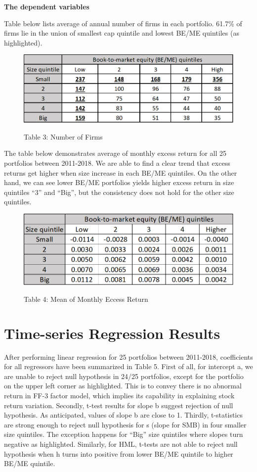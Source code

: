 \documentclass[12pt]{article}
\begin{document}
\textbf{The dependent variables}   

Table below lists average of annual number of firms in each portfolio. 61.7\% of firms lie in the union of smallest cap quintile and lowest BE/ME quintiles (as highlighted).



\begin{figure}[h]
	\centering
	\caption*{Table 3: Number of Firms}
	\includegraphics[width=0.5\linewidth]{A3.png}
	\label{fig:label}
\end{figure}

\noindent The table below demonstrates average of monthly excess return for all 25 portfolios between 2011-2018. We are able to find a clear trend that excess returns get higher when size increase in each BE/ME quintiles. On the other hand, we can see lower BE/ME portfolios yields higher excess return in size quintiles “3” and “Big”, but the consistency does not hold for the other size quintiles. 

\begin{figure}[h]
	\centering
	\caption*{Table 4: Mean of Monthly Eccess Return}
	\includegraphics[width=0.55\linewidth]{A4.png}
	\label{fig:label}
\end{figure}

\section{Time-series Regression Results}


After performing linear regression for 25 portfolios between 2011-2018, coefficients for all regressors have been summarized in Table 5. First of all, for intercept a, we are unable to reject null hypothesis in 24/25 portfolios, except for the portfolio on the upper left corner as highlighted. This is to convey there is no abnormal return in FF-3 factor model, which implies its capability in explaining stock return variation. Secondly, t-test results for slope b suggest rejection of null hypothesis. As anticipated, values of slope b are close to 1. Thirdly, t-statistics are strong enough to reject null hypothesis for s (slope for SMB) in four smaller size quintiles. The exception happens for “Big” size quintiles where slopes turn negative as highlighted. Similarly, for HML, t-tests are not able to reject null hypothesis when h turns into positive from lower BE/ME quintile to higher BE/ME quintile.
\end{document}

